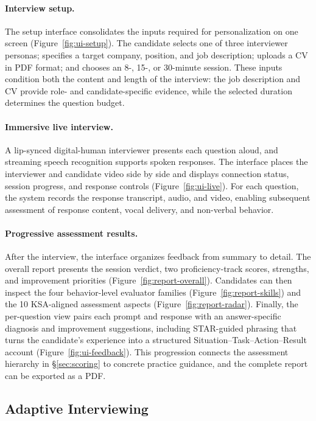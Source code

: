 \documentclass[11pt]{article}
\begin{document}
\paragraph{Interview setup.} The setup interface consolidates the inputs required for personalization on one screen (Figure~\ref{fig:ui-setup}). The candidate selects one of three interviewer personas; specifies a target company, position, and job description; uploads a CV in PDF format; and chooses an 8-, 15-, or 30-minute session. These inputs condition both the content and length of the interview: the job description and CV provide role- and candidate-specific evidence, while the selected duration determines the question budget.

\paragraph{Immersive live interview.} A lip-synced digital-human interviewer presents each question aloud, and streaming speech recognition supports spoken responses. The interface places the interviewer and candidate video side by side and displays connection status, session progress, and response controls (Figure~\ref{fig:ui-live}). For each question, the system records the response transcript, audio, and video, enabling subsequent assessment of response content, vocal delivery, and non-verbal behavior.

\paragraph{Progressive assessment results.} After the interview, the interface organizes feedback from summary to detail. The overall report presents the session verdict, two proficiency-track scores, strengths, and improvement priorities (Figure~\ref{fig:report-overall}). Candidates can then inspect the four behavior-level evaluator families (Figure~\ref{fig:report-skills}) and the 10 KSA-aligned assessment aspects (Figure~\ref{fig:report-radar}). Finally, the per-question view pairs each prompt and response with an answer-specific diagnosis and improvement suggestions, including STAR-guided phrasing that turns the candidate's experience into a structured Situation--Task--Action--Result account (Figure~\ref{fig:ui-feedback}). This progression connects the assessment hierarchy in \S\ref{sec:scoring} to concrete practice guidance, and the complete report can be exported as a PDF.

\subsection{Adaptive Interviewing}
\label{sec:match}
\end{document}
